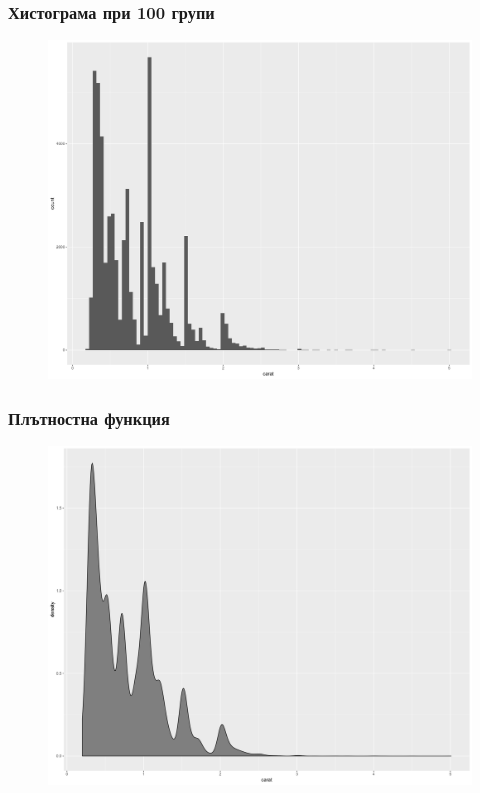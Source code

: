 \documentclass{beamer}
\begin{document}
\begin{frame}
\frametitle{Хистограма при 100 групи}
\begin{figure}[]\includegraphics[width=\textwidth,height=0.75\textheight]{pic0031}\end{figure}
\end{frame}

\begin{frame}
\frametitle{Плътностна функция}
\begin{figure}[]\includegraphics[width=\textwidth,height=0.75\textheight]{pic0032}\end{figure}
\end{frame}
\end{document}

